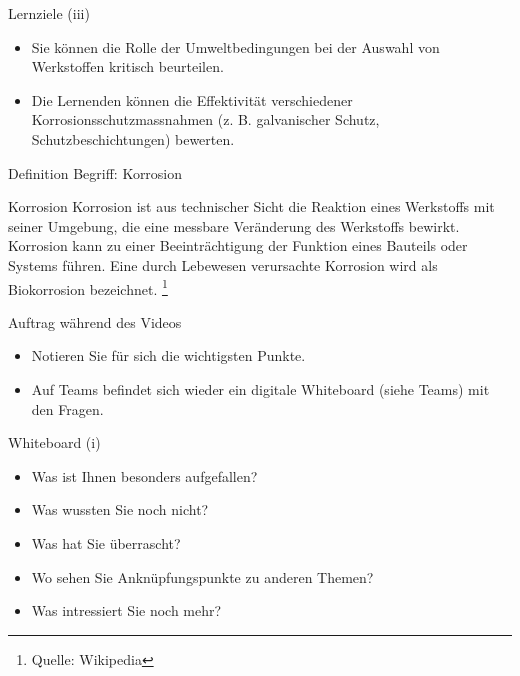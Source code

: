 \begin{frame}{Lernziele (iii)}
    \begin{myLernziele}
        \begin{itemize}
            \item[\textbullet] Sie können die Rolle der Umweltbedingungen bei der Auswahl von Werkstoffen kritisch beurteilen.
            \item[\textbullet] Die Lernenden können die Effektivität verschiedener Korrosionsschutzmassnahmen (z. B. galvanischer Schutz, Schutzbeschichtungen) bewerten.
        \end{itemize}
    \end{myLernziele}
\end{frame}




\begin{frame}{Definition Begriff: Korrosion}
    \begin{Definition_BS}{Korrosion}
        Korrosion ist aus technischer Sicht die Reaktion eines Werkstoffs mit seiner Umgebung, die
        eine messbare Veränderung des Werkstoffs bewirkt. Korrosion kann zu einer Beeinträchtigung
        der Funktion eines Bauteils oder Systems führen. Eine durch Lebewesen verursachte Korrosion
        wird als Biokorrosion bezeichnet. \footnote{Quelle: Wikipedia}
    \end{Definition_BS}
\end{frame}


\begin{frame}{Auftrag während des Videos}
    \begin{itemize}
        \item Notieren Sie für sich die wichtigsten Punkte.
        \item Auf Teams befindet sich wieder ein digitale Whiteboard (siehe Teams) mit den Fragen.
    \end{itemize}
\end{frame}


\begin{frame}{Whiteboard (i)}
    \begin{Fragenblock}
        \begin{itemize}
            \item[\textbullet]  Was ist Ihnen besonders aufgefallen?
            \item[\textbullet]  Was wussten Sie noch nicht?
            \item[\textbullet]  Was hat Sie überrascht?
            \item[\textbullet]  Wo sehen Sie Anknüpfungspunkte zu anderen Themen?
            \item[\textbullet]  Was intressiert Sie noch mehr?
        \end{itemize}
    \end{Fragenblock}

\end{frame}


